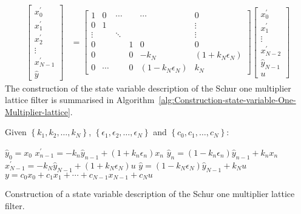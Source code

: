 \documentclass[a4paper,twoside,10pt,english]{article}
\begin{document}
\begin{align*}
\left[\begin{array}{c}
x_{0}^{\prime}\\
x_{1}^{\prime}\\
x_{2}^{\prime}\\
\vdots\\
x_{N-1}^{\prime}\\
\hat{y}
\end{array}\right] & = \left[\begin{array}{cccccc}
1 & 0 & \cdots &  & \cdots & 0\\
0 & 1 &  &  &  & \vdots\\
\vdots &  & \ddots & & & \vdots\\
0 &  &  & 1 & 0 & 0\\
0 &  &  &  0 & -k_{N} & \left(1+k_{N}\epsilon_{N}\right)\\
0 & \cdots &  & 0 & \left(1-k_{N}\epsilon_{N}\right) & k_{N}
\end{array}\right]\left[\begin{array}{c}
x_{0}^{\prime}\\
x_{1}^{\prime}\\
\vdots\\
x_{N-2}^{\prime}\\
\hat{y}_{N-1}\\
u
\end{array}\right]
\end{align*}
The construction of the state variable description of the Schur one multiplier
lattice filter is summarised in
Algorithm~\ref{alg:Construction-state-variable-One-Multiplier-lattice}.

\begin{algorithm}
Given $\left\{k_{1},k_{2},\hdots,k_{N}\right\}$,
$\left\{\epsilon_{1},\epsilon_{2},\hdots,\epsilon_{N}\right\}$ and
$\left\{c_{0},c_{1},\hdots,c_{N}\right\}$:
\begin{algorithmic}
\State $\hat{y}_{0} = x_{0}$
  \State $x_{n-1}^{\prime}=-k_{n}\hat{y}_{n-1}+\left(1+k_{n}\epsilon_{n}\right)x_{n}$
  \State $\hat{y}_{n}= \left(1-k_{n}\epsilon_{n}\right)\hat{y}_{n-1}+k_{n}x_{n}$
\EndFor
\State $x_{N-1}^{\prime} = -k_{N}\hat{y}_{N-1}+\left(1+k_{N}\epsilon_{N}\right)u$
\State $\hat{y} = \left(1-k_{N}\epsilon_{N}\right)\hat{y}_{N-1}+k_{N}u$
\State $y  = c_{0}x_{0}+c_{1}x_{1}+\cdots+c_{N-1}x_{N-1}+c_{N}u$
\end{algorithmic}
\caption{Construction of a state variable description of the Schur
  one multiplier lattice filter.}
\label{alg:Construction-state-variable-One-Multiplier-lattice}
\end{algorithm}
\end{document}
